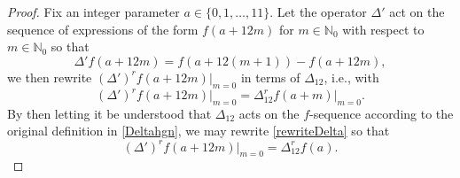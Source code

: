 \documentclass[11pt,letterpaper]{amsart}
\begin{document}
\begin{proof}
 Fix an integer parameter $a \in \{ 0, 1, \ldots, 11 \}$. Let the operator $\Delta'$ act on the sequence of expressions of the form $f(a + 
 12 m)$ for $m \in \mathbb{N}_{0}$ with respect to $m \in \mathbb{N}_{0}$ so that
\begin{equation}\label{Deltaprime}
 \Delta' f(a + 12 m) = f(a + 12 (m+1)) - f(a + 12m), 
\end{equation}
 we then rewrite $(\Delta')^{r} f(a + 12 m) \big|_{m=0}$ in terms of $\Delta_{12}$, i.e., with
\begin{equation}\label{rewriteDelta}
 (\Delta')^{r} f(a + 12 m) \big|_{m=0} = \Delta_{12}^{r} f(a + m) \big|_{m=0}. 
\end{equation}
 By then letting it be understood that $\Delta_{12}$ acts on the $f$-sequence according to the original definition in \eqref{Deltahgn}, we 
 may rewrite \eqref{rewriteDelta} so that 
\begin{equation}\label{actseq}
 (\Delta')^{r} f(a + 12 m) \big|_{m=0} = \Delta_{12}^{r} f(a). 
\end{equation}
 

\end{proof}
\end{document}
